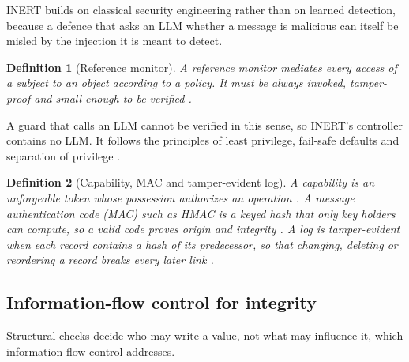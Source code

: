 \documentclass[pdflatex,sn-mathphys-num]{sn-jnl}
\theoremstyle{thmstyleone}%
\theoremstyle{thmstyletwo}%
\theoremstyle{thmstylethree}%
\newtheorem{definition}{Definition}%
\begin{document}
INERT builds on classical security engineering rather than on learned detection, because a defence that asks an LLM whether a message is malicious can itself be misled by the injection it is meant to detect. %

\begin{definition}[Reference monitor]\label{def:rm}
A \emph{reference monitor} mediates every access of a subject to an object according to a policy. It must be \emph{always invoked}, \emph{tamper-proof} and \emph{small enough to be verified} \citep{anderson1972planning}.
\end{definition}

A guard that calls an LLM cannot be verified in this sense, so INERT's controller contains no LLM. It follows the principles of least privilege, fail-safe defaults and separation of privilege \citep{saltzer1975protection}. %

\begin{definition}[Capability, MAC and tamper-evident log]\label{def:cap}
A \emph{capability} is an unforgeable token whose possession authorizes an operation \citep{dennis1966semantics}. A \emph{message authentication code} (MAC) such as HMAC is a keyed hash that only key holders can compute, so a valid code proves origin and integrity \citep{krawczyk1997hmac}. A log is \emph{tamper-evident} when each record contains a hash of its predecessor, so that changing, deleting or reordering a record breaks every later link \citep{schneier1999audit}.
\end{definition}

\subsection{Information-flow control for integrity}\label{sec:bg-ifc}

Structural checks decide who may write a value, not what may influence it, which information-flow control addresses.
\end{document}
